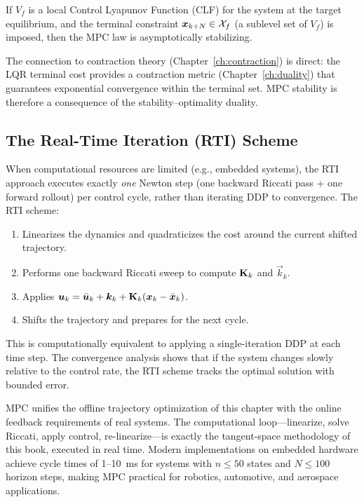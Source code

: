 \begin{theorem}
\label{thm:ch5:mpc-stability}
If $V_f$ is a local Control Lyapunov Function (CLF) for the system at the target
equilibrium, and the terminal constraint $\bm{x}_{k+N} \in \mathcal{X}_f$ (a sublevel set of
$V_f$) is imposed, then the MPC law is asymptotically stabilizing.
\end{theorem}

The connection to contraction theory (Chapter~\ref{ch:contraction}) is direct: the LQR
terminal cost provides a contraction metric (Chapter~\ref{ch:duality}) that guarantees
exponential convergence within the terminal set. MPC stability is therefore a consequence
of the stability--optimality duality.

\subsection{The Real-Time Iteration (RTI) Scheme}

When computational resources are limited (e.g., embedded systems), the RTI approach
executes exactly \emph{one} Newton step (one backward Riccati pass + one forward rollout)
per control cycle, rather than iterating DDP to convergence. The RTI scheme:

\begin{enumerate}
\item Linearizes the dynamics and quadraticizes the cost around the current shifted trajectory.
\item Performs one backward Riccati sweep to compute $\mathbf{K}_k$ and $\vec{k}_k$.
\item Applies $\bm{u}_k = \bar{\bm{u}}_k + \bm{k}_k + \mathbf{K}_k(\bm{x}_k - \bar{\bm{x}}_k)$.
\item Shifts the trajectory and prepares for the next cycle.
\end{enumerate}

This is computationally equivalent to applying a single-iteration DDP at each time step.
The convergence analysis shows that if the system changes slowly relative to the control
rate, the RTI scheme tracks the optimal solution with bounded error.

\begin{designbox}
MPC unifies the offline trajectory optimization of this chapter with the online feedback
requirements of real systems. The computational loop---linearize, solve Riccati, apply
control, re-linearize---is exactly the tangent-space methodology of this book, executed
in real time. Modern implementations on embedded hardware achieve cycle times of 1--10~ms
for systems with $n \leq 50$ states and $N \leq 100$ horizon steps, making MPC practical
for robotics, automotive, and aerospace applications.
\end{designbox}


